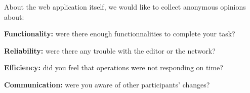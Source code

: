 About the web application itself, we would like to collect anonymous opinions
about:
\begin{asparadesc}
\item [\textbf{Functionality:}] were there enough functionnalities to complete
  your task?
\item [\textbf{Reliability:}] were there any trouble with the editor or the
  network?
\item [\textbf{Efficiency:}] did you feel that operations were not responding on
  time?
\item [\textbf{Communication:}] were you aware of other participants' changes?
\end{asparadesc}






